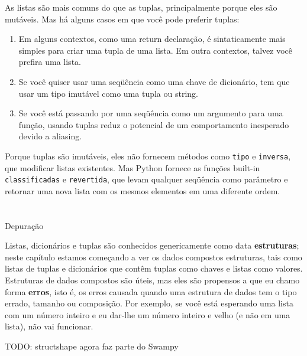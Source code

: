 \documentclass[10pt]{book}
\begin{document}
\begin{v erbatim}
As listas são mais comuns do que as tuplas, principalmente porque eles são mutáveis.
Mas há alguns casos em que você pode preferir tuplas:

\begin{enumerate}

\item Em alguns contextos, como uma {return \tt} declaração, é
sintaticamente mais simples para criar uma tupla de uma lista. Em outra
contextos, talvez você prefira uma lista.

\item Se você quiser usar uma seqüência como uma chave de dicionário,
tem que usar um tipo imutável como uma tupla ou string.

\item Se você está passando por uma seqüência como um argumento para uma função,
usando tuplas reduz o potencial de um comportamento inesperado
devido a aliasing.

\end{enumerate}

Porque tuplas são imutáveis, eles não fornecem métodos
como {\tt tipo} e {\tt inversa}, que modificar listas existentes.
Mas Python fornece as funções built-in {\tt classificadas}
e {\tt revertida}, que levam qualquer seqüência como parâmetro
e retornar uma nova lista com os mesmos elementos em uma diferente
ordem.


\section{} Depuração

Listas, dicionários e tuplas são conhecidos genericamente como {data \bf
  estruturas}; neste capítulo estamos começando a ver os dados compostos
estruturas, tais como listas de tuplas e dicionários que contêm tuplas
como chaves e listas como valores. Estruturas de dados compostos são úteis, mas
eles são propensos a que eu chamo {forma \bf erros}, isto é, os erros
causada quando uma estrutura de dados tem o tipo errado, tamanho ou composição.
Por exemplo, se você está esperando uma lista com um número inteiro e eu
dar-lhe um número inteiro e velho (e não em uma lista), não vai funcionar.

TODO: structshape agora faz parte do Swampy


\end{v erbatim}
\end{document}

